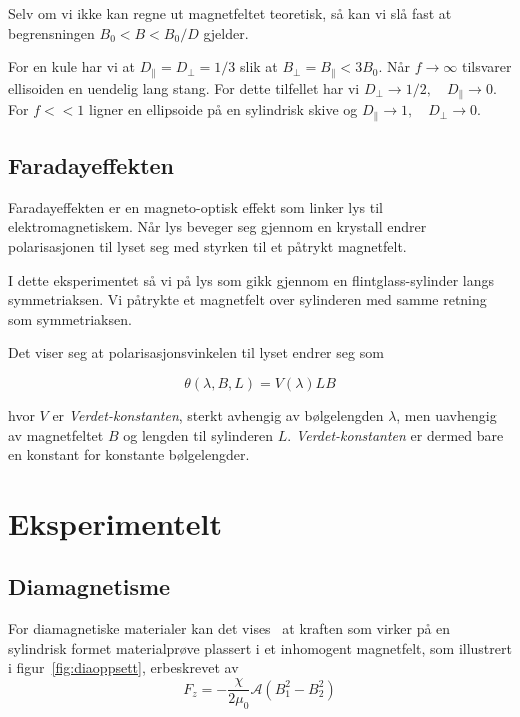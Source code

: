 \documentclass[a4paper,11pt, twocolumn]{article}
\begin{document}
Selv om vi ikke kan regne ut magnetfeltet teoretisk, så kan vi slå fast at begrensningen $B_0<B<B_0/D$ gjelder.

For en kule har vi at $D_\parallel=D_\perp=1/3$ slik at $B_\perp = B_\parallel <3B_0$. Når $f\rightarrow\infty$ tilsvarer ellisoiden en uendelig lang stang. For dette tilfellet har vi $D_\perp\rightarrow 1/2, \quad D_\parallel\rightarrow 0$. For $f<<1$ ligner en ellipsoide på en sylindrisk skive og $D_\parallel\rightarrow 1, \quad D_\perp\rightarrow 0$.

\subsection{Faradayeffekten}
Faradayeffekten er en magneto-optisk effekt som linker lys til elektromagnetiskem. Når lys beveger seg gjennom en krystall endrer polarisasjonen til lyset seg med styrken til et påtrykt magnetfelt.

I dette eksperimentet så vi på lys som gikk gjennom en flintglass-sylinder langs symmetriaksen. Vi påtrykte et magnetfelt over sylinderen med samme retning som symmetriaksen.

Det viser seg at polarisasjonsvinkelen til lyset endrer seg som

\begin{equation}
	\theta(\lambda, B, L) = V(\lambda)LB
	\label{eq:verdet}
\end{equation}

hvor $V$ er \textit{Verdet-konstanten}, sterkt avhengig av bølgelengden $\lambda$, men uavhengig av magnetfeltet $B$ og lengden til sylinderen $L$. \textit{Verdet-konstanten} er dermed bare en konstant for konstante bølgelengder.
\section{Eksperimentelt}
\subsection{Diamagnetisme}
For diamagnetiske materialer kan det vises~\cite{oppgavesett} at kraften som virker på en sylindrisk formet materialprøve plassert i et inhomogent magnetfelt, som illustrert i figur~\ref{fig:diaoppsett}, erbeskrevet av 
\begin{equation}
	F_z = -\frac{\chi}{2\mu_0}\mathcal{A}(B_1^2-B_2^2)
	\label{eq:dia}
\end{equation}
\end{document}
